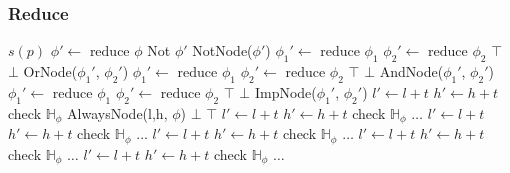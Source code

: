 \documentclass[10pt,a4paper]{article}
\newcommand{\Hist}[1]{\ensuremath{\mathbb{H}_{#1}}}
\begin{document}
\subsubsection*{Reduce}
\begin{algorithmic}
	\RETURN $s(p)$
\ELSIF{$\psi \equiv \neg \phi$}
	\STATE $\phi' \leftarrow \text{ reduce } \phi$
		\RETURN Not $\phi'$
	\ELSE
		\RETURN NotNode($\phi'$)
	\ENDIF
{}
	\STATE $\phi_1' \leftarrow \text{ reduce } \phi_1$
	\STATE $\phi_2' \leftarrow \text{ reduce } \phi_2$
		\RETURN $\top$ 
		\RETURN $\bot$
	\ELSE
		\RETURN OrNode($\phi_1'$, $\phi_2'$)
	\ENDIF
{}
	\STATE $\phi_1' \leftarrow \text{ reduce } \phi_1$
	\STATE $\phi_2' \leftarrow \text{ reduce } \phi_2$
		\RETURN $\top$ 
		\RETURN $\bot$
	\ELSE
		\RETURN AndNode($\phi_1'$, $\phi_2'$)
	\ENDIF
{}
	\STATE $\phi_1' \leftarrow \text{ reduce } \phi_1$
	\STATE $\phi_2' \leftarrow \text{ reduce } \phi_2$
		\RETURN $\top$ 
		\RETURN $\bot$
	\ELSE
		\RETURN ImpNode($\phi_1'$, $\phi_2'$)
	\ENDIF
\ELSIF{$\psi \equiv \square_{[l,h]} \phi$}
	\STATE $l' \leftarrow l + t$
	\STATE $h' \leftarrow h + t$
	\STATE check $\Hist{\phi}$
		\IF{$t \not\in \Hist{\phi}$}
			\RETURN AlwaysNode(l,h, $\phi$)
		\ELSIF{$\Hist{\phi}(t) = \bot$} 
			\RETURN $\bot$
		\ENDIF
	\ENDFOR
	\RETURN $\top$
\ELSIF{$\psi \equiv \lozenge_{[l,h]} \phi$}
	\STATE $l' \leftarrow l + t$
	\STATE $h' \leftarrow h + t$
	\STATE check $\Hist{\phi}$
	\STATE $\ldots$
	\STATE $l' \leftarrow l + t$
	\STATE $h' \leftarrow h + t$
	\STATE check $\Hist{\phi}$
	\STATE $\ldots$
\ELSIF{$\psi \equiv \blacksquare_{[l,h]} \phi$}
	\STATE $l' \leftarrow l + t$
	\STATE $h' \leftarrow h + t$
	\STATE check $\Hist{\phi}$
	\STATE $\ldots$
\ELSIF{$\psi \equiv \blacklozenge_{[l,h]} \phi$}
	\STATE $l' \leftarrow l + t$
	\STATE $h' \leftarrow h + t$
	\STATE check $\Hist{\phi}$
	\STATE $\ldots$
	\STATE $l' \leftarrow l + t$
	\STATE $h' \leftarrow h + t$
	\STATE check $\Hist{\phi}$
	\STATE $\ldots$
\ENDIF

\end{algorithmic}
\end{document}
